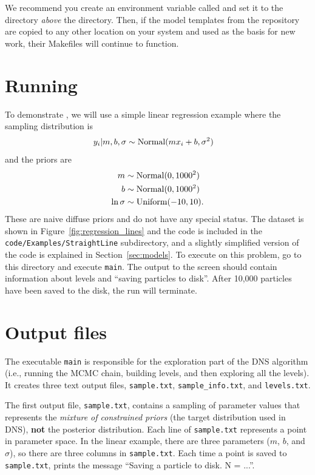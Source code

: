 \documentclass[article, nojss]{jss}
\begin{document}
We recommend you create an environment variable called 
and set it to the directory {\em above} the  directory. Then,
if the model templates from the  repository are copied
to any other location on your system and used as the basis for
new work, their Makefiles will continue to function.

\section[Running DNest4]{Running }\label{sec:running}
To demonstrate ,
we will use a simple linear regression example where the
sampling distribution is
\begin{align}
y_i | m, b, \sigma &\sim \textnormal{Normal}(mx_i + b, \sigma^2)
\end{align}
and the priors are
\begin{align}
m &\sim \textnormal{Normal}(0, 1000^2)\\
b &\sim \textnormal{Normal}(0, 1000^2)\\
\ln\sigma &\sim \textnormal{Uniform}(-10, 10).
\end{align}
These are naive diffuse priors and do not have any special status.
The dataset is shown in Figure~\ref{fig:regression_lines}
and the code is included in the {\tt code/Examples/StraightLine}
subdirectory, and a slightly simplified version of the
code is explained in Section~\ref{sec:models}.
To execute  on this problem, go to this directory and
execute {\tt main}. The output to the screen
should contain information about levels and ``saving particles to disk''.
After 10,000 particles have been saved to the disk, the run will terminate.

\section{Output files}
The executable {\tt main} is responsible for the exploration part of the
DNS algorithm (i.e., running the MCMC chain, building
levels, and then exploring all the levels). It creates three text output files,
{\tt sample.txt}, {\tt sample\_info.txt}, and {\tt levels.txt}.

The first output
file, {\tt sample.txt}, contains a sampling of parameter values that
represents the {\it mixture of constrained priors} (the target distribution
used in DNS), {\bf not} the
posterior distribution. Each line of {\tt sample.txt} represents a point in
parameter space. In the linear example, there are three parameters
($m$, $b$, and $\sigma$), so there
are three columns in {\tt sample.txt}.
Each time a point is saved to {\tt sample.txt},  prints
the message ``Saving a particle to disk. N = ...''.
\end{document}
